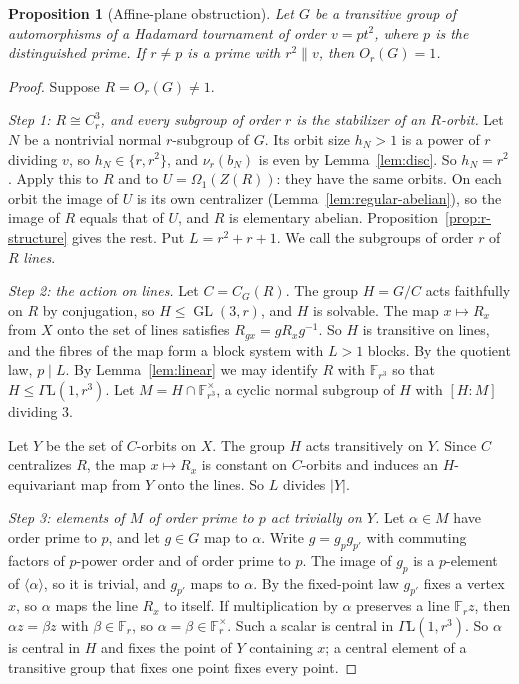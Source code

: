 \documentclass[11pt]{amsart}
\newtheorem{proposition}[theorem]{Proposition}
\theoremstyle{definition}
\theoremstyle{remark}
\newcommand{\F}{\mathbb{F}}
\newcommand{\GL}{\operatorname{GL}}
\newcommand{\GaL}{\Gamma\mathrm{L}}
\begin{document}
\begin{proposition}[Affine-plane obstruction]\label{prop:plane}
Let $G$ be a transitive group of automorphisms of a Hadamard tournament of order $v=pt^2$, where $p$ is the distinguished prime. If $r\ne p$ is a prime with $r^2\parallel v$, then $O_r(G)=1$.
\end{proposition}
\begin{proof}
Suppose $R=O_r(G)\ne1$.

\emph{Step 1: $R\cong C_r^3$, and every subgroup of order $r$ is the stabilizer of an $R$-orbit.} Let $N$ be a nontrivial normal $r$-subgroup of $G$. Its orbit size $h_N>1$ is a power of $r$ dividing $v$, so $h_N\in\{r,r^2\}$, and $\nu_r(b_N)$ is even by Lemma~\ref{lem:disc}. So $h_N=r^2$. Apply this to $R$ and to $U=\Omega_1(Z(R))$: they have the same orbits. On each orbit the image of $U$ is its own centralizer (Lemma~\ref{lem:regular-abelian}), so the image of $R$ equals that of $U$, and $R$ is elementary abelian. Proposition~\ref{prop:r-structure} gives the rest. Put $L=r^2+r+1$. We call the subgroups of order $r$ of $R$ \emph{lines}.

\emph{Step 2: the action on lines.} Let $C=C_G(R)$. The group $H=G/C$ acts faithfully on $R$ by conjugation, so $H\le\GL(3,r)$, and $H$ is solvable. The map $x\mapsto R_x$ from $X$ onto the set of lines satisfies $R_{gx}=gR_xg^{-1}$. So $H$ is transitive on lines, and the fibres of the map form a block system with $L>1$ blocks. By the quotient law, $p\mid L$. By Lemma~\ref{lem:linear} we may identify $R$ with $\F_{r^3}$ so that $H\le\GaL(1,r^3)$. Let $M=H\cap\F_{r^3}^\times$, a cyclic normal subgroup of $H$ with $[H:M]$ dividing $3$.

Let $Y$ be the set of $C$-orbits on $X$. The group $H$ acts transitively on $Y$. Since $C$ centralizes $R$, the map $x\mapsto R_x$ is constant on $C$-orbits and induces an $H$-equivariant map from $Y$ onto the lines. So $L$ divides $|Y|$.

\emph{Step 3: elements of $M$ of order prime to $p$ act trivially on $Y$.} Let $\alpha\in M$ have order prime to $p$, and let $g\in G$ map to $\alpha$. Write $g=g_pg_{p'}$ with commuting factors of $p$-power order and of order prime to $p$. The image of $g_p$ is a $p$-element of $\langle\alpha\rangle$, so it is trivial, and $g_{p'}$ maps to $\alpha$. By the fixed-point law $g_{p'}$ fixes a vertex $x$, so $\alpha$ maps the line $R_x$ to itself. If multiplication by $\alpha$ preserves a line $\F_rz$, then $\alpha z=\beta z$ with $\beta\in\F_r$, so $\alpha=\beta\in\F_r^\times$. Such a scalar is central in $\GaL(1,r^3)$. So $\alpha$ is central in $H$ and fixes the point of $Y$ containing $x$; a central element of a transitive group that fixes one point fixes every point.


\end{proof}
\end{document}

